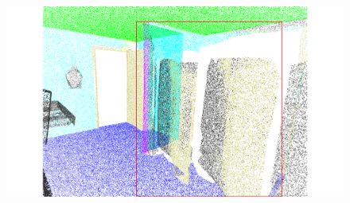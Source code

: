 \begin{figure}[htbp]
\begin{minipage}{0.22\textwidth}
    \end{minipage}
    \hfill
    \begin{minipage}{0.22\textwidth}
        \centering
        \includegraphics[width=\textwidth]{fig/supplement/semantic_segmentation/wc_2/IDPT_wc_2.pdf}
    \end{minipage}
    \hfill

    \vspace{0.5em}


\end{figure}
